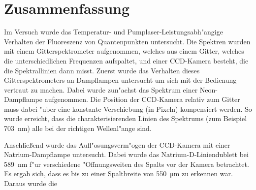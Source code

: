 \section{Zusammenfassung}
Im Versuch wurde das Temperatur- und Pumplaser-Leistungsabh"angige Verhalten der Fluoreszenz von Quantenpunkten untersucht.
Die Spektren wurden mit einem Gitterspektrometer aufgenommen, welches aus einem Gitter, welches die unterschiedlichen Frequenzen aufspaltet, und einer CCD-Kamera besteht, die die Spektrallinien dann misst.
Zuerst wurde das Verhalten dieses Gitterspektrometers an Dampflampen untersucht um sich mit der Bedienung vertraut zu machen.
Dabei wurde zun"achst das Spektrum einer Neon-Dampflampe aufgenommen.
Die Position der CCD-Kamera relativ zum Gitter muss dabei "uber eine konstante Verschiebung (in Pixeln) kompensiert werden.
So wurde erreicht, dass die charakterisierenden Linien des Spektrums (zum Beispiel \SI{703}{nm}) alle bei der richtigen Wellenl"ange sind.

Anschlie\ss end wurde das Aufl"osungsverm"ogen der CCD-Kamera mit einer Natrium-Dampflampe untersucht.
Dabei wurde das Natrium-D-Liniendublett bei \SI{589}{nm} f"ur verschiedene "Offnungsweiten des Spalts vor der Kamera betrachtet.
Es ergab sich, dass es bis zu einer Spaltbreite von \SI{550}{\micro\metre} zu erkennen war.
Daraus wurde die 

